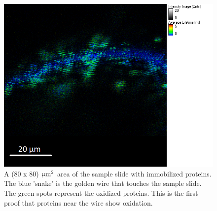 \documentclass[twoside,single]{lion-msc}
\begin{document}
\begin{figure}[ht!]
\centering
\includegraphics[width=\textwidth]{goldwire_1}
\caption{A (80 x 80) $\upmu \textup{m}^{2}$ area of the sample slide with immobilized proteins. The blue 'snake' is the golden wire that touches the sample slide. The green spots represent the oxidized proteins. This is the first proof that proteins near the wire show oxidation.}
\label{goldenwire_1}
\end{figure}
\end{document}
